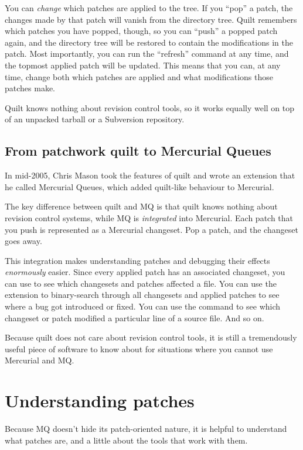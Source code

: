 You can \emph{change} which patches are applied to the tree.  If you
``pop'' a patch, the changes made by that patch will vanish from the
directory tree.  Quilt remembers which patches you have popped,
though, so you can ``push'' a popped patch again, and the directory
tree will be restored to contain the modifications in the patch.  Most
importantly, you can run the ``refresh'' command at any time, and the
topmost applied patch will be updated.  This means that you can, at
any time, change both which patches are applied and what
modifications those patches make.

Quilt knows nothing about revision control tools, so it works equally
well on top of an unpacked tarball or a Subversion repository.

\subsection{From patchwork quilt to Mercurial Queues}
\label{sec:mq:quilt-mq}

In mid-2005, Chris Mason took the features of quilt and wrote an
extension that he called Mercurial Queues, which added quilt-like
behaviour to Mercurial.

The key difference between quilt and MQ is that quilt knows nothing
about revision control systems, while MQ is \emph{integrated} into
Mercurial.  Each patch that you push is represented as a Mercurial
changeset.  Pop a patch, and the changeset goes away.

This integration makes understanding patches and debugging their
effects \emph{enormously} easier.  Since every applied patch has an
associated changeset, you can use  to
see which changesets and patches affected a file.  You can use the
 extension to binary-search through all changesets and
applied patches to see where a bug got introduced or fixed.  You can
use the  command to see which changeset or patch
modified a particular line of a source file.  And so on.

Because quilt does not care about revision control tools, it is still
a tremendously useful piece of software to know about for situations
where you cannot use Mercurial and MQ.

\section{Understanding patches}

Because MQ doesn't hide its patch-oriented nature, it is helpful to
understand what patches are, and a little about the tools that work
with them.

